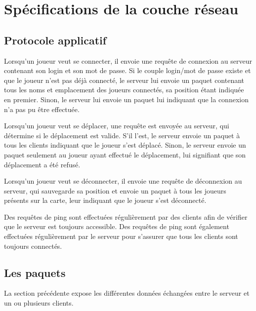 \documentclass[11pt, a4paper]{report}
\begin{document}
  \section{Spécifications de la couche réseau}
  
    \subsection{Protocole applicatif}
    
      Lorsqu'un joueur veut se connecter, il envoie une requête de connexion au serveur contenant son login et son mot de passe.
      Si le couple login/mot de passe existe et que le joueur n'est pas déjà connecté, le serveur lui envoie un paquet contenant 
      tous les noms et emplacement des joueurs connectés, sa position étant indiquée en premier.
      Sinon, le serveur lui envoie un paquet lui indiquant que la connexion n'a pas pu être effectuée.
      \newline

      Lorsqu'un joueur veut se déplacer, une requête est envoyée au serveur, qui détermine si le déplacement est valide.
      S'il l'est, le serveur envoie un paquet à tous les clients indiquant que le joueur s'est déplacé.
      Sinon, le serveur envoie un paquet seulement au joueur ayant effectué le déplacement, lui signifiant que son déplacement 
      a été refusé.
      \newline

      Lorsqu'un joueur veut se déconnecter, il envoie une requête de déconnexion au serveur, qui sauvegarde sa position et envoie 
      un paquet à tous les joueurs présents sur la carte, leur indiquant que le joueur s'est déconnecté.
      \newline

      Des requêtes de ping sont effectuées régulièrement par des clients afin de vérifier que le serveur est toujours accessible.
      Des requêtes de ping sont également effectuées régulièrement par le serveur pour s'assurer que tous les clients sont toujours 
      connectés.
    
    \subsection{Les paquets}
    
      La section précédente expose les différentes données échangées entre le serveur et un ou plusieurs clients.
      \newline
      
\end{document}
